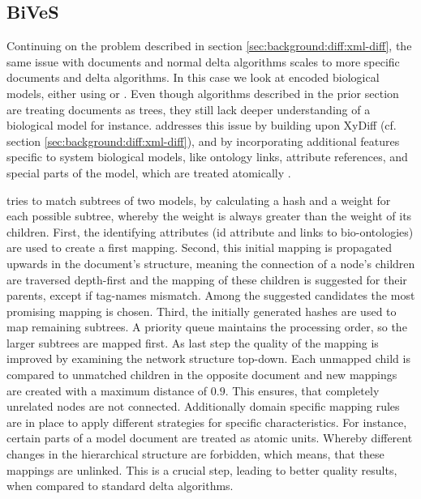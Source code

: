 	\subsection{BiVeS}
	\label{sec:background:diff:bives}
	Continuing on the problem described in section \ref{sec:background:diff:xml-diff}, the same issue with \xml documents and normal delta algorithms scales to more specific documents and \xml delta algorithms. In this case we look at \xml encoded biological models, either using \cellml or \sbml. Even though algorithms described in the prior section are treating \xml documents as trees, they still lack deeper understanding of a biological model for instance. \bives addresses this issue by building upon XyDiff (cf. section \ref{sec:background:diff:xml-diff}), and by incorporating additional features specific to system biological models, like ontology links, attribute references, and special parts of the model, which are treated atomically \citep{Scharm2015}.
	
	\bives tries to match subtrees of two models, by calculating a hash and a weight for each possible subtree, whereby the weight is always greater than the weight of its children.
	First, the identifying attributes (\xml id attribute and links to bio-ontologies) are used to create a first mapping. Second, this initial mapping is propagated upwards in the document's structure, meaning the connection of a node's children are traversed depth-first and the mapping of these children is suggested for their parents, except if tag-names mismatch. Among the suggested candidates the most promising mapping is chosen.
	Third, the initially generated hashes are used to map remaining subtrees. A priority queue maintains the processing order, so the larger subtrees are mapped first.
	As last step the quality of the mapping is improved by examining the network structure top-down. Each unmapped child is compared to unmatched children in the opposite document and new mappings are created with a maximum distance of $0.9$. This ensures, that completely unrelated nodes are not connected.
	Additionally domain specific mapping rules are in place to apply different strategies for specific characteristics. For instance, certain parts of a model document are treated as atomic units. Whereby different changes in the hierarchical structure are forbidden, which means, that these mappings are unlinked. This is a crucial step, leading to better quality results, when compared to standard \xml delta algorithms.
	
